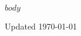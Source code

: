 \documentclass[10pt,sans]{moderncv}        %
\begin{document}
\begin{CJK*}{UTF8}{gbsn}
\makecvtitle

$body$

\vfill
Updated \today
\end{CJK*}
\end{document}
